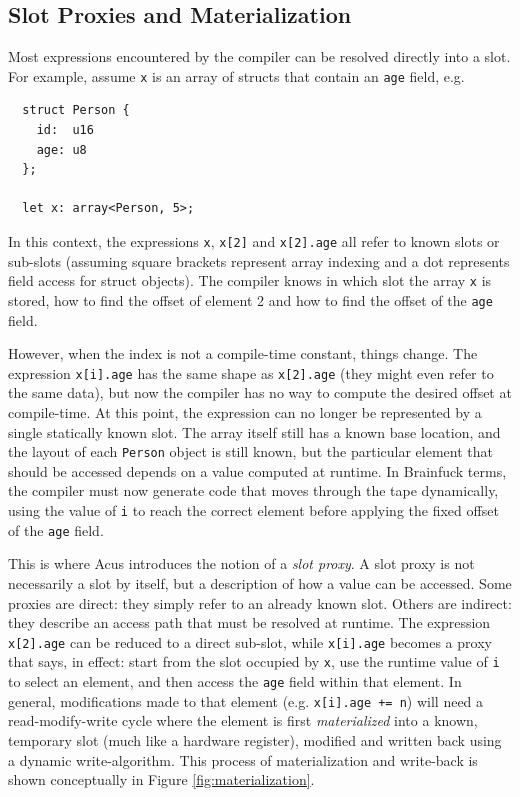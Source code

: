 \subsection{Slot Proxies and Materialization}
\label{sec:compilation:slotproxies}
Most expressions encountered by the compiler can be resolved directly into a slot. For example, assume \texttt{x} is an array of structs that contain an \texttt{age} field, e.g. 

\begin{lstlisting}
  struct Person {
    id:  u16
    age: u8
  };

  let x: array<Person, 5>;
\end{lstlisting}

In this context, the expressions \texttt{x}, \texttt{x[2]} and \texttt{x[2].age} all refer to known slots or sub-slots (assuming square brackets represent array indexing and a dot represents field access for struct objects). The compiler knows in which slot the array \texttt{x} is stored, how to find the offset of element 2 and how to find the offset of the \texttt{age} field.

However, when the index is not a compile-time constant, things change. The expression \texttt{x[i].age} has the same shape as \texttt{x[2].age} (they might even refer to the same data), but now the compiler has no way to compute the desired offset at compile-time. At this point, the expression can no longer be represented by a single statically known slot. The array itself still has a known base location, and the layout of each \texttt{Person} object is still known, but the particular element that should be accessed depends on a value computed at runtime. In Brainfuck terms, the compiler must now generate code that moves through the tape dynamically, using the value of \texttt{i} to reach the correct element before applying the fixed offset of the \texttt{age} field.

This is where Acus introduces the notion of a \emph{slot proxy}. A slot proxy is not necessarily a slot by itself, but a description of how a value can be accessed. Some proxies are direct: they simply refer to an already known slot. Others are indirect: they describe an access path that must be resolved at runtime. The expression \texttt{x[2].age} can be reduced to a direct sub-slot, while \texttt{x[i].age} becomes a proxy that says, in effect: start from the slot occupied by \texttt{x}, use the runtime value of \texttt{i} to select an element, and then access the \texttt{age} field within that element. In general, modifications made to that element (e.g. \texttt{x[i].age += n}) will need a read-modify-write cycle where the element is first \emph{materialized} into a known, temporary slot (much like a hardware register), modified and written back using a dynamic write-algorithm. This process of materialization and write-back is shown conceptually in Figure \ref{fig:materialization}.

